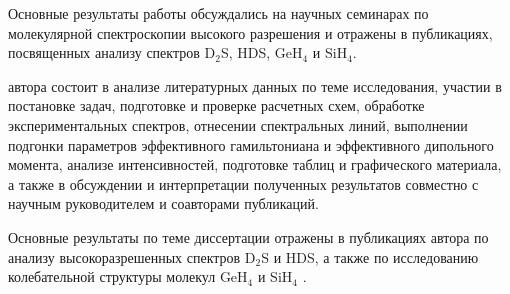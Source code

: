 {\probation} Основные результаты работы обсуждались на научных семинарах по молекулярной
спектроскопии высокого разрешения и отражены в публикациях, посвященных анализу спектров D$_2$S,
HDS, GeH$_4$ и SiH$_4$. %

{\contribution} автора состоит в анализе литературных данных по теме исследования, участии в постановке
задач, подготовке и проверке расчетных схем, обработке экспериментальных спектров, отнесении
спектральных линий, выполнении подгонки параметров эффективного гамильтониана и эффективного
дипольного момента, анализе интенсивностей, подготовке таблиц и графического материала, а также в
обсуждении и интерпретации полученных результатов совместно с научным руководителем и соавторами
публикаций.

{\publications} Основные результаты по теме диссертации отражены в публикациях автора по анализу
высокоразрешенных спектров D$_2$S и HDS, а также по исследованию колебательной структуры молекул
GeH$_4$ и SiH$_4$ \cite{d2s_sydow2019,hds_sydow2019,ulen1,ulen2}. %
